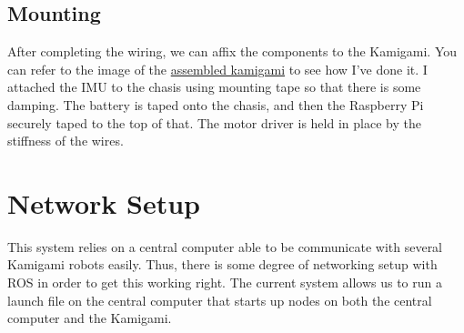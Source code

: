 \documentclass[11pt]{article}
\begin{document}
\subsection{Mounting}
After completing the wiring, we can affix the components to the Kamigami. You can refer to the image of the \hyperref[fig:kamigami]{assembled kamigami} to see how I've done it. 
I attached the IMU to the chasis using mounting tape so that there is some damping. The battery is taped onto the chasis, and then the Raspberry Pi securely taped to the top of that. The motor driver is held in place by the stiffness of the wires.

\section{Network Setup}
This system relies on a central computer able to be communicate with several Kamigami robots easily. Thus, there is some degree of networking setup with ROS in order to get this working right. The current system allows us to run a launch file on the central computer that starts up nodes on both the central computer and the Kamigami.
\end{document}
